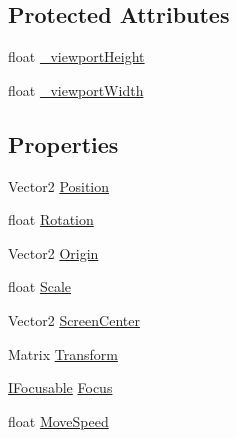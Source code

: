 \subsection*{Protected Attributes}
\begin{DoxyCompactItemize}
\item 
float \hyperlink{class_athena_engine_1_1_framework_1_1_camera2_d_a485bfef4ff5f718addc49d3eec88b0e7}{\-\_\-viewport\-Height}
\item 
float \hyperlink{class_athena_engine_1_1_framework_1_1_camera2_d_af7ec19f2874045d548709d58f8778dd9}{\-\_\-viewport\-Width}
\end{DoxyCompactItemize}
\subsection*{Properties}
\begin{DoxyCompactItemize}
\item 
Vector2 \hyperlink{class_athena_engine_1_1_framework_1_1_camera2_d_aaf39bcf56a3bd9c8eabdfd8032acda3b}{Position}
\item 
float \hyperlink{class_athena_engine_1_1_framework_1_1_camera2_d_a63df0638761ca57e15812d6ca118236a}{Rotation}
\item 
Vector2 \hyperlink{class_athena_engine_1_1_framework_1_1_camera2_d_ad9aebbc898c0b225e77a662b0bef7d35}{Origin}
\item 
float \hyperlink{class_athena_engine_1_1_framework_1_1_camera2_d_a253bc4fde9f95baeedc7e18b5633f62f}{Scale}
\item 
Vector2 \hyperlink{class_athena_engine_1_1_framework_1_1_camera2_d_a9ee30e517de34f7fb5d3675d28f2c9ce}{Screen\-Center}
\item 
Matrix \hyperlink{class_athena_engine_1_1_framework_1_1_camera2_d_a8cd757e58b30a4c4d57778ff2d1a79f2}{Transform}
\item 
\hyperlink{interface_athena_engine_1_1_framework_1_1_interfaces_1_1_i_focusable}{I\-Focusable} \hyperlink{class_athena_engine_1_1_framework_1_1_camera2_d_a2b2773d78bddeccbe6a01fb90fefecd5}{Focus}
\item 
float \hyperlink{class_athena_engine_1_1_framework_1_1_camera2_d_a5471ca8fa9dd3a511a4669ebb2db9784}{Move\-Speed}
\end{DoxyCompactItemize}


